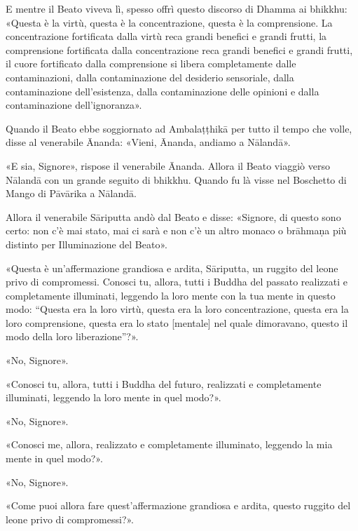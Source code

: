 E mentre il Beato viveva lì, spesso offrì questo discorso di Dhamma ai
bhikkhu: «Questa è la virtù, questa è la concentrazione, questa è la
comprensione. La concentrazione fortificata dalla virtù reca grandi
benefici e grandi frutti, la comprensione fortificata dalla
concentrazione reca grandi benefici e grandi frutti, il cuore
fortificato dalla comprensione si libera completamente dalle
contaminazioni, dalla contaminazione del desiderio sensoriale, dalla
contaminazione dell’esistenza, dalla contaminazione delle opinioni e
dalla contaminazione dell’ignoranza».


Quando il Beato ebbe soggiornato ad Ambalaṭṭhikā per tutto il tempo che
volle, disse al venerabile Ānanda: «Vieni, Ānanda, andiamo a Nālandā».


«E sia, Signore», rispose il venerabile Ānanda. Allora il Beato viaggiò
verso Nālandā con un grande seguito di bhikkhu. Quando fu là visse nel
Boschetto di Mango di Pāvārika a Nālandā.




Allora il venerabile Sāriputta andò dal Beato e disse: «Signore, di
questo sono certo: non c’è mai stato, mai ci sarà e non c’è un altro
monaco o brāhmaṇa più distinto per Illuminazione del Beato».


«Questa è un’affermazione grandiosa e ardita, Sāriputta, un ruggito del
leone privo di compromessi. Conosci tu, allora, tutti i Buddha del
passato realizzati e completamente illuminati, leggendo la loro mente
con la tua mente in questo modo: “Questa era la loro virtù, questa era
la loro concentrazione, questa era la loro comprensione, questa era lo
stato [mentale] nel quale dimoravano, questo il modo della loro
liberazione”?».


«No, Signore».


«Conosci tu, allora, tutti i Buddha del futuro, realizzati e
completamente illuminati, leggendo la loro mente in quel modo?».


«No, Signore».


«Conosci me, allora, realizzato e completamente illuminato, leggendo la
mia mente in quel modo?».


«No, Signore».


«Come puoi allora fare quest’affermazione grandiosa e ardita, questo
ruggito del leone privo di compromessi?».


